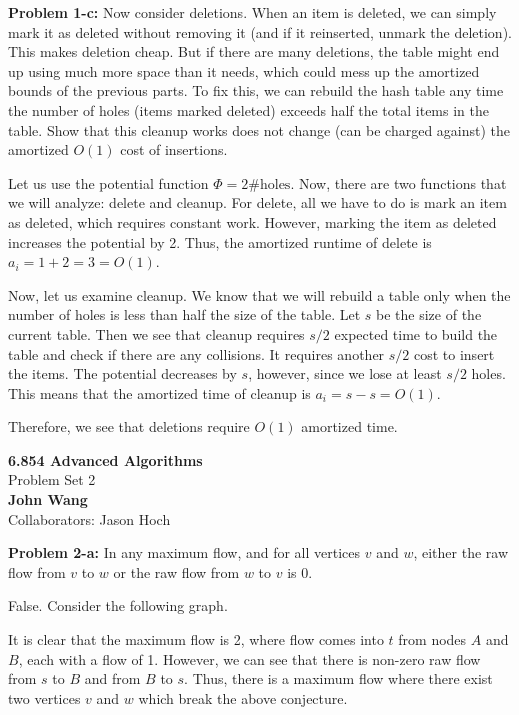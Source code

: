 \documentclass[psamsfonts]{amsart}
\newenvironment{sol}{\vspace{0.25cm}{\large \bfseries Solution:}}{\qedsymbol}
\newenvironment{prob}[1]{\begin{framed}{\large \bfseries Problem #1:}}{\end{framed}}
\newcommand{\makenewtitle}{
    \begin{center}
    {\huge \bfseries 6.854 Advanced Algorithms} \\
    Problem Set 2\\
    \vspace{0.25cm}
    {\bfseries John Wang} \\
    Collaborators: Jason Hoch
    \end{center}
    \vspace{0.5cm}
}
\begin{document}
\begin{prob}{1-c}
Now consider deletions. When an item is deleted, we can simply mark it as deleted without removing it (and if it reinserted, unmark the deletion). This makes deletion cheap. But if there are many deletions, the table might end up using much more space than it needs, which could mess up the amortized bounds of the previous parts. To fix this, we can rebuild the hash table any time the number of holes (items marked deleted) exceeds half the total items in the table. Show that this cleanup works does not change (can be charged against) the amortized $O(1)$ cost of insertions.
\end{prob}
\begin{sol}
Let us use the potential function $\Phi = 2 \text{\# holes}$. Now, there are two functions that we will analyze: delete and cleanup. For delete, all we have to do is mark an item as deleted, which requires constant work. However, marking the item as deleted increases the potential by 2. Thus, the amortized runtime of delete is $a_i = 1 + 2 = 3 = O(1)$. 

Now, let us examine cleanup. We know that we will rebuild a table only when the number of holes is less than half the size of the table. Let $s$ be the size of the current table. Then we see that cleanup requires $s/2$ expected time to build the table and check if there are any collisions. It requires another $s/2$ cost to insert the items. The potential decreases by $s$, however, since we lose at least $s/2$ holes. This means that the amortized time of cleanup is $a_i = s - s = O(1)$. 

Therefore, we see that deletions require $O(1)$ amortized time.
\end{sol}

\newpage 
\makenewtitle

\begin{prob}{2-a}
In any maximum flow, and for all vertices $v$ and $w$, either the raw flow from $v$ to $w$ or the raw flow from $w$ to $v$ is 0.
\end{prob}
\begin{sol}
False. Consider the following graph.

\begin{figure}[h!]
\centering
{}
\end{figure}

It is clear that the maximum flow is 2, where flow comes into $t$ from nodes $A$ and $B$, each with a flow of 1. However, we can see that there is non-zero raw flow from $s$ to $B$ and from $B$ to $s$. Thus, there is a maximum flow where there exist two vertices $v$ and $w$ which break the above conjecture.
\end{sol}
\end{document}
